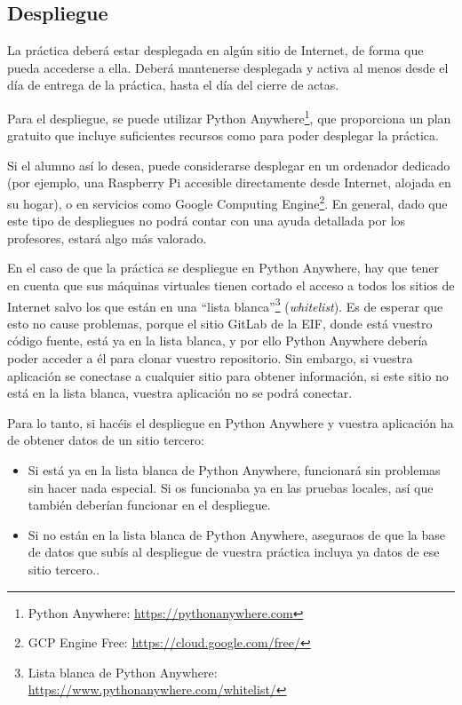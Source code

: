 \subsection{Despliegue}
\label{sec:practica-2024-05:despliegue}

La práctica deberá estar desplegada en algún sitio de Internet, de forma que pueda accederse a ella. Deberá mantenerse desplegada y activa al menos desde el día de entrega de la práctica, hasta el día del cierre de actas.

Para el despliegue, se puede utilizar Python Anywhere\footnote{Python Anywhere: \url{https://pythonanywhere.com}}, que proporciona un plan gratuito que incluye suficientes recursos como para poder desplegar la práctica.

Si el alumno así lo desea, puede considerarse desplegar en un ordenador dedicado (por ejemplo, una Raspberry Pi accesible directamente desde Internet, alojada en su hogar), o en servicios como Google Computing Engine\footnote{GCP Engine Free: \url{https://cloud.google.com/free/}}. En general, dado que este tipo de despliegues no podrá contar con una ayuda detallada por los profesores, estará algo más valorado.

En el caso de que la práctica se despliegue en Python Anywhere, hay que tener en cuenta que sus máquinas virtuales tienen cortado el acceso a todos los sitios de Internet salvo los que están en una ``lista blanca''\footnote{Lista blanca de Python Anywhere: \url{https://www.pythonanywhere.com/whitelist/}} (\emph{whitelist}). Es de esperar que esto no cause problemas, porque el sitio GitLab de la EIF, donde está vuestro código fuente, está ya en la lista blanca, y por ello Python Anywhere debería poder acceder a él para clonar vuestro repositorio. Sin embargo, si vuestra aplicación se conectase a cualquier sitio para obtener información, si este sitio no está en la lista blanca, vuestra aplicación no se podrá conectar.

Para lo tanto, si hacéis el despliegue en Python Anywhere y vuestra aplicación ha de obtener datos de un sitio tercero:

\begin{itemize}
  \item Si está ya en la lista blanca de Python Anywhere, funcionará sin problemas sin hacer nada especial. Si os funcionaba ya en las pruebas locales, así que también deberían funcionar en el despliegue.
  \item Si no están en la lista blanca de Python Anywhere, aseguraos de que la base de datos que subís al despliegue de vuestra práctica incluya ya datos de ese sitio tercero..
\end{itemize}


